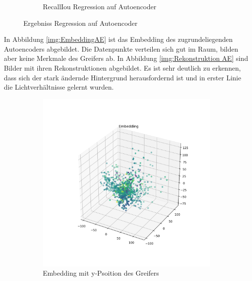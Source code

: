 \begin{figure}[h]
\begin{subfigure}[c]{0.49\textwidth}
    		\caption[Recall-IoU]{RecallIou Regression auf Autoencoder}
    		\label{img:RecalllIoUt_RegressionAufAutoencoder}	
    	\end{subfigure}
    	\caption{Ergebniss Regression auf Autoencoder}
        \label{img:ErgebnissRegressionAufAE}
    \end{figure}
 
	In Abbildung \ref{img:EmbeddingAE} ist das Embedding des zugrundeliegenden Autoencoders abgebildet. Die Datenpunkte verteilen sich gut im Raum, bilden aber keine Merkmale des Greifers ab.  In Abbildung \ref{img:Rekonstruktion AE} sind Bilder mit ihren Rekonstruktionen abgebildet. Es ist sehr deutlich zu erkennen, dass sich der stark ändernde Hintergrund herausfordernd ist und in erster Linie die Lichtverhältnisse gelernt wurden.   
	
	  \begin{figure}[h]
		\centering
		\begin{subfigure}[c]{0.49\textwidth}			
			\includegraphics[width=1\textwidth,center]{bilder/Hauptteil/Autoencoder_Grappel_Detection/Embedding_y.png}
			\caption{Embedding mit y-Psoition des Greifers}
			\label{img:BoxPlot_RegressionAufAutoencoder}	
		\end{subfigure}
		\begin{subfigure}[c]{0.49\textwidth}			

\end{subfigure}
\end{figure}
